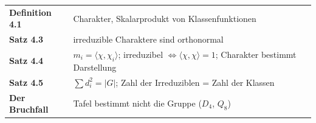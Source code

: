\begin{merksatz}
\begin{center}
\renewcommand{\arraystretch}{1.5}
\begin{tabular}{@{}P{3.0cm}P{5.6cm}@{}}
\toprule
\textbf{Definition 4.1} & Charakter, Skalarprodukt von Klassenfunktionen\\
\textbf{Satz 4.3} & irreduzible Charaktere sind orthonormal\\
\textbf{Satz 4.4} & $m_i = \langle\chi, \chi_i\rangle$; irreduzibel $\iff\langle\chi, \chi\rangle = 1$; Charakter bestimmt Darstellung\\
\textbf{Satz 4.5} & $\sum d_i^{2} = |G|$; Zahl der Irreduziblen = Zahl der Klassen\\
\textbf{Der Bruchfall} & Tafel bestimmt nicht die Gruppe ($D_4$, $Q_8$)\\
\bottomrule
\end{tabular}
\end{center}

\begin{center}
\begin{minipage}{0.88\textwidth}
\end{minipage}
\end{center}
\end{merksatz}
